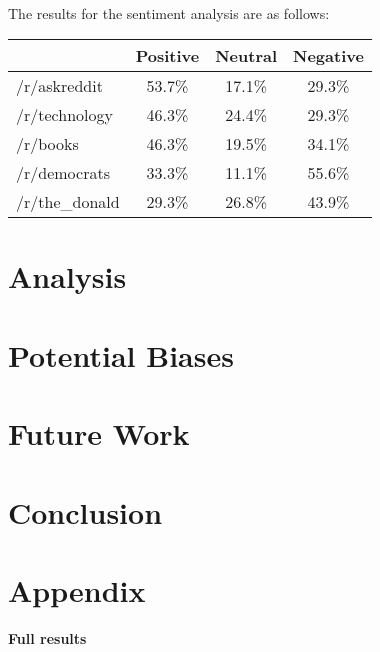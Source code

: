 \documentclass[11pt]{article}
\begin{document}
	\\[2\baselineskip]
	The results for the sentiment analysis are as follows:
	\\[2\baselineskip]
	\begin{tabular}{l|ccc}
		& Positive & Neutral & Negative \\\hline
		/r/askreddit & 53.7\% & 17.1\% & 29.3\% \\
		/r/technology & 46.3\% & 24.4\% & 29.3\% \\
		/r/books & 46.3\% & 19.5\% & 34.1\% \\
		/r/democrats & 33.3\% & 11.1\% & 55.6\% \\
		/r/the\_donald & 29.3\% & 26.8\% & 43.9\%
	\end{tabular}

	\section{Analysis}\label{sec:analysis}
	\section{Potential Biases}\label{sec:biases}
	\section{Future Work}\label{sec:future}
	\section{Conclusion}\label{sec:conclusion}
	\section{Appendix}\label{sec:appendix}
	\textbf{Full results}
	
	
\end{document}
